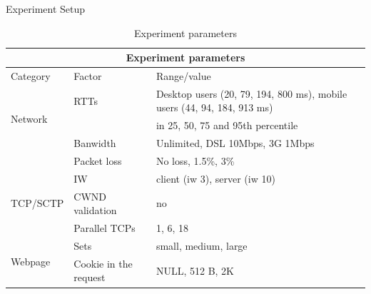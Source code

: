 \documentclass[t,xcolor=dvipsnames,english,bigger,aspectratio=43,hyperref={unicode=true}]{beamer}
\begin{document}
\begin{frame}{Experiment Setup}
\tiny
\begin{table}[t!]
\label{tab:exp_param}
  \centering
\begin{tabular}{|l|l|l|}

\hline
\multicolumn{3}{|c|}{Experiment parameters} \\
\hline
Category & Factor & Range/value \\ \hline
\multirow{3}{*}{Network} & RTTs & Desktop users (20, 79, 194, 800 ms), mobile users (44, 94, 184, 913 ms)\\
 &&in 25, 50, 75 and 95th percentile  \\
 & Banwidth & Unlimited, DSL 10Mbps, 3G 1Mbps\\
 & Packet loss & No loss, 1.5\%, 3\% \\ \hline
\multirow{3}{*}{TCP/SCTP} & IW & client (iw 3), server (iw 10) \\
 & CWND validation & no \\
 & Parallel TCPs & 1, 6, 18 \\ \hline
\multirow{2}{*}{Webpage} & Sets & small, medium, large  \\
 & Cookie in the request & NULL, 512 B, 2K \\
\hline
\end{tabular}
\caption{Experiment parameters}
\end{table}


\centering
{}

\end{frame}
\end{document}
